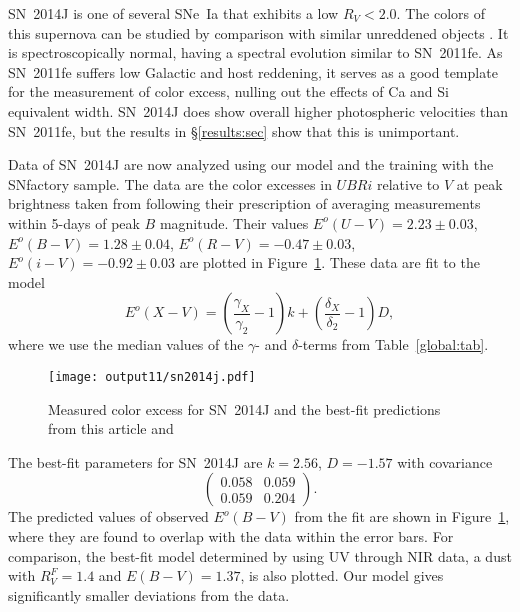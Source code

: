 \documentclass{aastex}   	%
\begin{document}
SN~2014J   is one of several SNe~Ia that exhibits a low $R_V<2.0$.
The colors of this supernova can be studied by comparison with similar unreddened objects
\citep[e.g.][]{2006MNRAS.369.1880E,2007AJ....133...58K,2008MNRAS.384..107E,2010AJ....139..120F, 2014ApJ...788L..21A}.
It is spectroscopically normal, having a spectral evolution similar to SN~2011fe.
As SN~2011fe suffers low Galactic and host reddening, it serves as a good template
for the measurement of color excess, nulling out the effects of Ca and Si equivalent width.
SN~2014J does show
overall higher photospheric velocities than SN~2011fe, but the results in \S\ref{results:sec} show that this is unimportant.


Data of SN~2014J are now analyzed using our model and the training with the SNfactory sample.
The data are the color excesses  in $UBRi$  relative to $V$ at peak brightness  taken from \citet{2014ApJ...788L..21A}
following their prescription of averaging measurements within 5-days of peak $B$ magnitude.
Their values 
$E^o(U-V) =   2.23 \pm   0.03$,
$E^o(B-V) =   1.28 \pm   0.04$,
$E^o(R-V) =  -0.47 \pm   0.03$,
$E^o(i-V) =  -0.92 \pm   0.03$
are plotted in Figure~\ref{sn2014j:fig}.
These data are fit to the model
\begin{equation}
E^o(X-V) =  \left(\frac{\gamma_X}{\gamma_2}-1\right)k +  \left(\frac{\delta_X}{\delta_2}-1\right)D,
\end{equation}
where we use the median values of the $\gamma$- and $\delta$-terms from Table~\ref{global:tab}.

\begin{figure}[htbp] %
   \centering
   \texttt{[image: output11/sn2014j.pdf]} 
   \caption{Measured color excess for SN~2014J and the best-fit predictions from this article and  \citet{2014ApJ...788L..21A}  
   \label{sn2014j:fig}}
\end{figure}

The best-fit parameters for SN~2014J are $k= 2.56$, $ D=-1.57$ with covariance
\begin{equation}
\begin{pmatrix}
0.058 & 0.059 \\
0.059 & 0.204
\end{pmatrix}.
\end{equation}
The predicted values of observed $E^o(B-V)$ from the fit are shown in Figure~\ref{sn2014j:fig}, where they are found to
overlap with the data within the error bars.   For comparison, the best-fit model determined by  \citet{2014ApJ...788L..21A} using
UV through NIR data,
a  \citet{1999PASP..111...63F} dust with $R_V^F=1.4$ and $E(B-V)=1.37$, 
is also plotted.  Our model gives significantly smaller deviations from the data.
\end{document}
